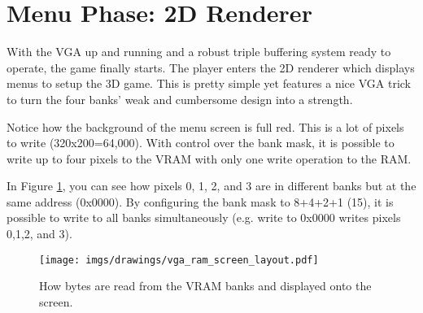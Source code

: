 \section{Menu Phase: 2D Renderer}
With the VGA up and running and a robust triple buffering system ready to operate, the game finally starts. The player enters the 2D renderer which displays menus to setup the 3D game. This is pretty simple yet features a nice VGA trick to turn the four banks' weak and cumbersome design into a strength.
\par
\begin{figure}[H]
\centering
{}
\end{figure}
\par

Notice how the background of the menu screen is full red. This is a lot of pixels to write (320x200=64,000). With control over the bank mask, it is possible to write up to four pixels to the VRAM with only one write operation to the RAM.\\
\par
 In Figure \ref{vga_layout_1}, you can see how pixels 0, 1, 2, and 3 are in different banks but at the same address (0x0000). By configuring the bank mask to 8+4+2+1 (15), it is possible to write to all banks simultaneously (e.g. write to 0x0000 writes pixels 0,1,2, and 3).\\
\par
\begin{figure}[H]
\centering
\texttt{[image: imgs/drawings/vga\_ram\_screen\_layout.pdf]}
\caption{How bytes are read from the VRAM banks and displayed onto the screen.}
\label{vga_layout_1}
\end{figure}

